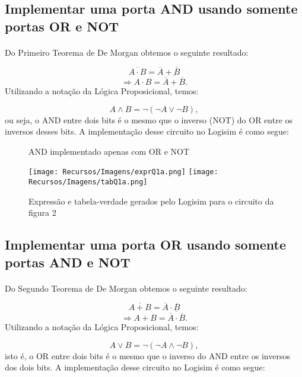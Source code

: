 \documentclass[a4paper, 12pt]{article}
\begin{document}
\subsection{Implementar uma porta AND usando somente portas OR e NOT}
\paragraph{}
Do Primeiro Teorema de De Morgan obtemos o seguinte resultado:

\[
\overline{A \cdot B} = \overline{A} + \overline{B}
\]
\[
\Rightarrow A \cdot B = \overline{\overline{A} + \overline{B}}.
\]
Utilizando a notação da Lógica Proposicional, temos:

\[
A \land B = \lnot (\lnot A \lor \lnot B),
\]
ou seja, o AND entre dois bits é o mesmo que o inverso (NOT) do OR entre os inversos desses bits. A implementação desse circuito no Logisim é como segue:

\begin{figure}[H]
    \centering
    
    \vspace{-30pt}
    \caption{AND implementado apenas com OR e NOT}
\end{figure}

\begin{figure}[H]
    \centering
    \texttt{[image: Recursos/Imagens/exprQ1a.png]}
    \texttt{[image: Recursos/Imagens/tabQ1a.png]} \\
    \caption{Expressão e tabela-verdade gerados pelo Logisim para o circuito da figura 2}
\end{figure}

\subsection{Implementar uma porta OR usando somente portas AND e NOT}
\paragraph{}
Do Segundo Teorema de De Morgan obtemos o seguinte resultado:

\[
\overline{A + B} = \overline{A} \cdot \overline{B}
\]
\[
\Rightarrow A + B = \overline{\overline{A} \cdot \overline{B}}.
\]
Utilizando a notação da Lógica Proposicional, temos:

\[
A \lor B = \lnot (\lnot A \land \lnot B),
\]
isto é, o OR entre dois bits é o mesmo que o inverso do AND entre os inversos dos dois bits. A implementação desse circuito no Logisim é como segue:
\end{document}
